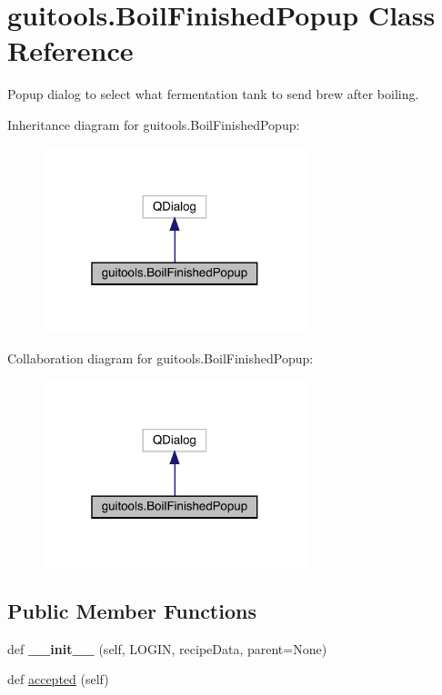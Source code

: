 \hypertarget{classguitools_1_1_boil_finished_popup}{}\section{guitools.\+Boil\+Finished\+Popup Class Reference}
\label{classguitools_1_1_boil_finished_popup}


Popup dialog to select what fermentation tank to send brew after boiling.  




Inheritance diagram for guitools.\+Boil\+Finished\+Popup\+:\nopagebreak
\begin{figure}[H]
\begin{center}
\leavevmode
\includegraphics[width=217pt]{classguitools_1_1_boil_finished_popup__inherit__graph}
\end{center}
\end{figure}


Collaboration diagram for guitools.\+Boil\+Finished\+Popup\+:\nopagebreak
\begin{figure}[H]
\begin{center}
\leavevmode
\includegraphics[width=217pt]{classguitools_1_1_boil_finished_popup__coll__graph}
\end{center}
\end{figure}
\subsection*{Public Member Functions}
\begin{DoxyCompactItemize}
\item 
\mbox{\label{classguitools_1_1_boil_finished_popup_a8fdd3d096563442b5fe1bb838312c593}} 
def {\bfseries \+\_\+\+\_\+init\+\_\+\+\_\+} (self, L\+O\+G\+IN, recipe\+Data, parent=None)
\item 
def \mbox{\hyperlink{classguitools_1_1_boil_finished_popup_a49b7a64add2e7f150c452cccfb7c8341}{accepted}} (self)
\end{DoxyCompactItemize}
